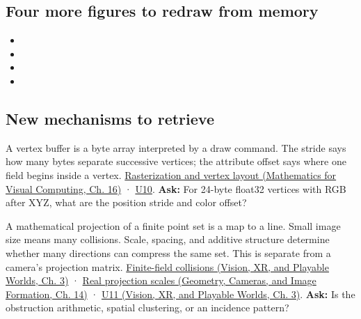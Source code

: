 \subsection{Four more figures to redraw from memory}\label{appendix-a8f634b076b5-four-more-figures-to-redraw-from-memory}

\begin{itemize}
\tightlist
\item
\item
\item
\item
\end{itemize}

\subsection{New mechanisms to retrieve}\label{appendix-a8f634b076b5-new-mechanisms-to-retrieve}

A vertex buffer is a byte array interpreted by a draw command. The stride says how many bytes separate successive vertices; the attribute offset says where one field begins inside a vertex. \href{../02-Mathematics-for-Visual-Computing/main.pdf\#nameddest=03-visual-computing-i-ch012-rasterization-coverage-and-depth}{Rasterization and vertex layout (Mathematics for Visual Computing, Ch. 16)} · \hyperref[03-visual-computing-i-ch018-figure-u10---vertex-fetch-uses-a-stride-and-byte-offset]{U10}. \textbf{Ask:} For 24-byte float32 vertices with RGB after XYZ, what are the position stride and color offset?

A mathematical projection of a finite point set is a map to a line. Small image size means many collisions. Scale, spacing, and additive structure determine whether many directions can compress the same set. This is separate from a camera's projection matrix. \href{../07-Vision-XR-and-Playable-Worlds/main.pdf\#nameddest=04-visual-computing-ii-ch032-finite-field-projections-turn-image-size-into-collision-counts}{Finite-field collisions (Vision, XR, and Playable Worlds, Ch. 3)} · \href{../03-Geometry-Cameras-and-Image-Formation/main.pdf\#nameddest=04-visual-computing-ii-ch033-real-projections-add-scale-spacing-and-incidence-geometry}{Real projection scales (Geometry, Cameras, and Image Formation, Ch. 14)} · \href{../07-Vision-XR-and-Playable-Worlds/main.pdf\#nameddest=04-visual-computing-ii-ch032-figure-u11---finite-grid-projections-expose-collision-counts}{U11 (Vision, XR, and Playable Worlds, Ch. 3)}. \textbf{Ask:} Is the obstruction arithmetic, spatial clustering, or an incidence pattern?

